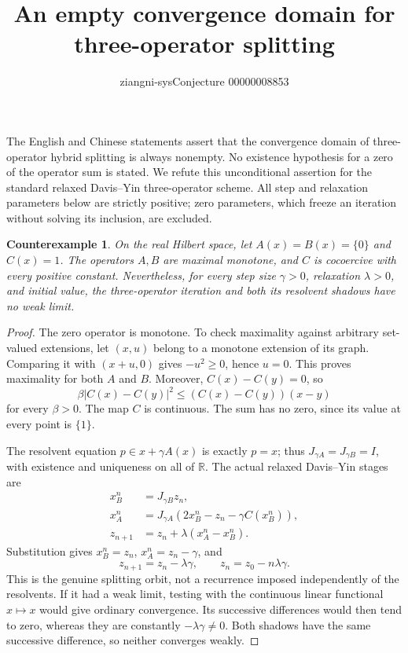 \documentclass[11pt]{article}
\title{An empty convergence domain for three-operator splitting}
\author{ziangni-sys\quad Conjecture 00000008853}
\date{}
\newtheorem*{proposition}{Counterexample}
\begin{document}
\maketitle
\vspace{-1em}
The English and Chinese statements assert that the convergence domain of three-operator hybrid splitting is always nonempty. No existence hypothesis for a zero of the operator sum is stated. We refute this unconditional assertion for the standard relaxed Davis--Yin three-operator scheme. All step and relaxation parameters below are strictly positive; zero parameters, which freeze an iteration without solving its inclusion, are excluded.

\begin{proposition}
On the real Hilbert space, let $A(x)=B(x)=\{0\}$ and $C(x)=1$. The operators $A,B$ are maximal monotone, and $C$ is cocoercive with every positive constant. Nevertheless, for every step size $\gamma>0$, relaxation $\lambda>0$, and initial value, the three-operator iteration and both its resolvent shadows have no weak limit.
\end{proposition}
\begin{proof}
The zero operator is monotone. To check maximality against arbitrary set-valued extensions, let $(x,u)$ belong to a monotone extension of its graph. Comparing it with $(x+u,0)$ gives $-u^2\geq0$, hence $u=0$. This proves maximality for both $A$ and $B$. Moreover, $C(x)-C(y)=0$, so
\[
 \beta |C(x)-C(y)|^2\leq (C(x)-C(y))(x-y)
\]
for every $\beta>0$. The map $C$ is continuous. The sum has no zero, since its value at every point is $\{1\}$.

The resolvent equation $p\in x+\gamma A(x)$ is exactly $p=x$; thus $J_{\gamma A}=J_{\gamma B}=I$, with existence and uniqueness on all of $\mathbb R$. The actual relaxed Davis--Yin stages are
\begin{align*}
 x_B^n&=J_{\gamma B}z_n,\\
 x_A^n&=J_{\gamma A}(2x_B^n-z_n-\gamma C(x_B^n)),\\
 z_{n+1}&=z_n+\lambda(x_A^n-x_B^n).
\end{align*}
Substitution gives $x_B^n=z_n$, $x_A^n=z_n-\gamma$, and
\[
 z_{n+1}=z_n-\lambda\gamma,\qquad
 z_n=z_0-n\lambda\gamma.
\]
This is the genuine splitting orbit, not a recurrence imposed independently of the resolvents. If it had a weak limit, testing with the continuous linear functional $x\mapsto x$ would give ordinary convergence. Its successive differences would then tend to zero, whereas they are constantly $-\lambda\gamma\ne0$. Both shadows have the same successive difference, so neither converges weakly.
\end{proof}
\end{document}
